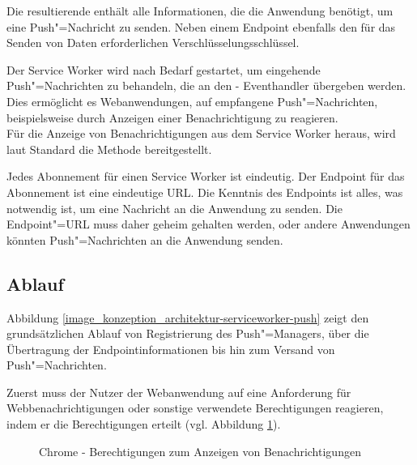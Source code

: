 Die resultierende  enthält alle Informationen, die die Anwendung benötigt, um eine Push"=Nachricht zu senden. Neben einem Endpoint ebenfalls den für das Senden von Daten erforderlichen Verschlüsselungsschlüssel.

Der Service Worker wird nach Bedarf gestartet, um eingehende Push"=Nachrichten zu behandeln, die an den - Eventhandler übergeben werden. Dies ermöglicht es Webanwendungen, auf empfangene Push"=Nachrichten, beispielsweise durch Anzeigen einer Benachrichtigung zu reagieren. \\
Für die Anzeige von Benachrichtigungen aus dem Service Worker heraus, wird laut Standard die Methode  bereitgestellt.

Jedes Abonnement für einen Service Worker ist eindeutig. Der Endpoint für das Abonnement ist eine eindeutige URL. Die Kenntnis des Endpoints ist alles, was notwendig ist, um eine Nachricht an die Anwendung zu senden. Die Endpoint"=URL muss daher geheim gehalten werden, oder andere Anwendungen könnten Push"=Nachrichten an die Anwendung senden.

\subsection{Ablauf}

Abbildung \ref{image_konzeption_architektur-serviceworker-push} zeigt den grundsätzlichen Ablauf von Registrierung des Push"=Managers, über die Übertragung der Endpointinformationen bis hin zum Versand von Push"=Nachrichten. 

Zuerst  muss der Nutzer der Webanwendung auf eine Anforderung für Webbenachrichtigungen oder sonstige verwendete Berechtigungen reagieren, indem er die Berechtigungen erteilt (vgl. Abbildung \ref{image_konzeption_notification-permission}). \\

\begin{figure}[htp] 
\caption{Chrome - Berechtigungen zum Anzeigen von Benachrichtigungen}
\label{image_konzeption_notification-permission}
\end{figure} 

